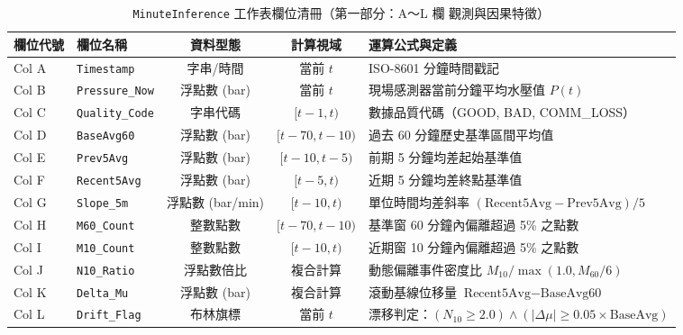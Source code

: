 \documentclass[fontset=none, a4paper, 12pt]{ctexart}
\begin{document}
\begin{table}[H]
    \centering
    \caption{\texttt{MinuteInference} 工作表欄位清冊（第一部分：A～L 欄 觀測與因果特徵）}
    \label{tab:minute_inference_pt1}
    \footnotesize
    \begin{tabularx}{\textwidth}{llccX}
        \toprule
        \textbf{欄位代號} & \textbf{欄位名稱} & \textbf{資料型態} & \textbf{計算視域} & \textbf{運算公式與定義} \\
        \midrule
        Col A & \texttt{Timestamp} & 字串/時間 & 當前 $t$ & ISO-8601 分鐘時間戳記 \\
        Col B & \texttt{Pressure\_Now} & 浮點數 (bar) & 當前 $t$ & 現場感測器當前分鐘平均水壓值 $P(t)$ \\
        Col C & \texttt{Quality\_Code} & 字串代碼 & $[t-1, t)$ & 數據品質代碼（GOOD, BAD, COMM\_LOSS） \\
        Col D & \texttt{BaseAvg60} & 浮點數 (bar) & $[t-70, t-10)$ & 過去 60 分鐘歷史基準區間平均值 \\
        Col E & \texttt{Prev5Avg} & 浮點數 (bar) & $[t-10, t-5)$ & 前期 5 分鐘均差起始基準值 \\
        Col F & \texttt{Recent5Avg} & 浮點數 (bar) & $[t-5, t)$ & 近期 5 分鐘均差終點基準值 \\
        Col G & \texttt{Slope\_5m} & 浮點數 (bar/min) & $[t-10, t)$ & 單位時間均差斜率 $(\text{Recent5Avg}-\text{Prev5Avg})/5$ \\
        Col H & \texttt{M60\_Count} & 整數點數 & $[t-70, t-10)$ & 基準窗 60 分鐘內偏離超過 5\% 之點數 \\
        Col I & \texttt{M10\_Count} & 整數點數 & $[t-10, t)$ & 近期窗 10 分鐘內偏離超過 5\% 之點數 \\
        Col J & \texttt{N10\_Ratio} & 浮點數倍比 & 複合計算 & 動態偏離事件密度比 $M_{10} / \max(1.0, M_{60}/6)$ \\
        Col K & \texttt{Delta\_Mu} & 浮點數 (bar) & 複合計算 & 滾動基線位移量 $\text{Recent5Avg} - \text{BaseAvg60}$ \\
        Col L & \texttt{Drift\_Flag} & 布林旗標 & 當前 $t$ & 漂移判定：$(N_{10} \ge 2.0) \land (|\Delta\mu| \ge 0.05 \times \text{BaseAvg})$ \\
        \bottomrule
    \end{tabularx}
\end{table}
\end{document}
